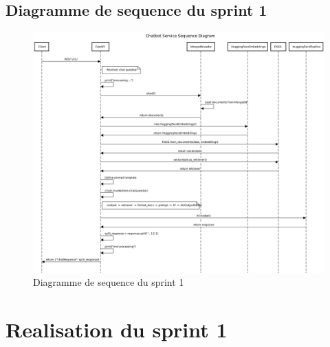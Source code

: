 \documentclass[a4paper, 11pt, openany]{report}
\begin{document}
\subsection{Diagramme de sequence du sprint 1}
\begin{figure}[H]
\centering
\includegraphics[width=1.2\textwidth]{assets/images/chatbot-seq.png}
\caption{Diagramme de sequence du sprint 1}
\label{fig:sprint1_seq}
\end{figure}

\section{Realisation du sprint 1}
\end{document}
